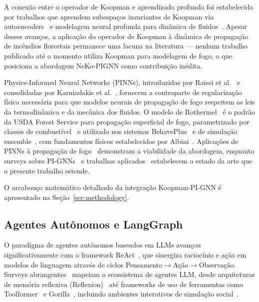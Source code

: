 \documentclass[preprint,times,numbers]{elsarticle}
\begin{document}
A conexão entre o operador de Koopman e aprendizado profundo foi estabelecida por trabalhos que aprendem subespaços invariantes de Koopman via autoencoders~\cite{article:lusch2018,article:takeishi2017} e modelagem neural profunda para dinâmica de fluidos~\cite{article:morton2019}. Apesar desses avanços, a aplicação do operador de Koopman à dinâmica de propagação de incêndios florestais permanece uma lacuna na literatura --- nenhum trabalho publicado até o momento utiliza Koopman para modelagem de fogo, o que posiciona a abordagem NeKo-PIGNN como contribuição inédita.

Physics-Informed Neural Networks (PINNs), introduzidas por Raissi et al.~\cite{article:raissi2019} e consolidadas por Karniadakis et al.~\cite{article:karniadakis2021}, fornecem a contraparte de regularização física necessária para que modelos neurais de propagação de fogo respeitem as leis da termodinâmica e da mecânica dos fluidos. O modelo de Rothermel~\cite{article:rothermel1972} é o padrão da USDA Forest Service para propagação superficial de fogo, parametrizado por classes de combustível~\cite{article:scott2001} e utilizado nos sistemas BehavePlus~\cite{article:andrews2014} e de simulação ensemble~\cite{article:finney2011}, com fundamentos físicos estabelecidos por Albini~\cite{article:albini1976}. Aplicações de PINNs à propagação de fogo~\cite{article:vogiatzoglou2024,article:mao2024pinn} demonstram a viabilidade da abordagem, enquanto surveys sobre PI-GNNs~\cite{article:gigante2025} e trabalhos aplicados~\cite{article:gao2023,article:li2025} estabelecem o estado da arte que o presente trabalho estende.

O arcabouço matemático detalhado da integração Koopman-PI-GNN é apresentado na Seção~\ref{sec:methodology}.

\subsection{Agentes Autônomos e LangGraph}

O paradigma de agentes autônomos baseados em LLMs avançou significativamente com o framework ReAct~\cite{article:react2023}, que sinergiza raciocínio e ação em modelos de linguagem através de ciclos Pensamento$\rightarrow$Ação$\rightarrow$Observação. Surveys abrangentes~\cite{article:xi2023,article:wang2024survey} mapeiam o ecossistema de agentes LLM, desde arquiteturas de memória reflexiva (Reflexion)~\cite{article:shinn2023} até frameworks de uso de ferramentas como Toolformer~\cite{article:schick2023} e Gorilla~\cite{article:patil2023}, incluindo ambientes interativos de simulação social~\cite{article:park2023}.
\end{document}
